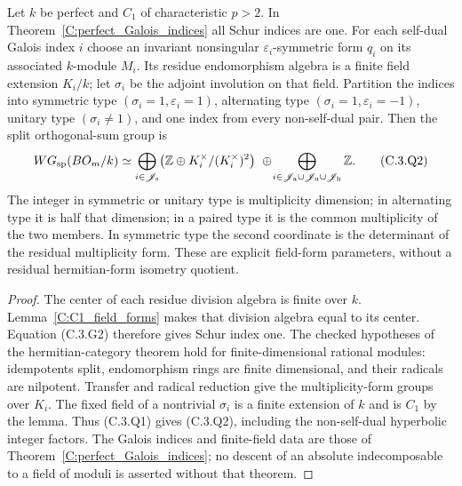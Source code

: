 \begin{proposition}
\label{C:C1_Galois_WG}
Let $k$ be perfect and $C_1$ of characteristic $p>2$.
In Theorem~\ref{C:perfect_Galois_indices} all Schur indices are one.
For each self-dual Galois index $i$ choose an invariant nonsingular
$\varepsilon_i$-symmetric form $q_i$ on its associated $k$-module $M_i$.
Its residue endomorphism algebra is a finite field extension $K_i/k$;
let $\sigma_i$ be the adjoint involution on that field. Partition
the indices into symmetric type $(\sigma_i=1,\varepsilon_i=1)$,
alternating type $(\sigma_i=1,\varepsilon_i=-1)$, unitary type
$(\sigma_i\ne1)$, and one index from every non-self-dual pair.
Then the split orthogonal-sum group is
\[
 WG_{\rm sp}(BO_m/k)\simeq
 \bigoplus_{i\in\mathscr J_{\rm s}}
    \bigl(\mathbb Z\oplus K_i^\times/(K_i^\times)^2\bigr)
 \ \oplus\!
 \bigoplus_{i\in\mathscr J_{\rm a}\cup\mathscr J_{\rm u}
                      \cup\mathscr J_{\rm h}}\mathbb Z .    \tag{C.3.Q2}
\]
The integer in symmetric or unitary type is multiplicity dimension;
in alternating type it is half that dimension; in a paired type it
is the common multiplicity of the two members. In symmetric type
the second coordinate is the determinant of the residual multiplicity
form. These are explicit field-form parameters, without a residual
hermitian-form isometry quotient.
\end{proposition}
\begin{proof}
The center of each residue division algebra is finite over $k$.
Lemma~\ref{C:C1_field_forms} makes that division algebra equal to its
center. Equation (C.3.G2) therefore gives Schur index one.
The checked hypotheses of the hermitian-category theorem
\cite[Propositions 2.4--2.5 and Theorems 3.2--3.3,
pp.271--273]{C-QSS1979} hold for finite-dimensional rational modules:
idempotents split, endomorphism rings are finite dimensional, and their
radicals are nilpotent. Transfer and radical reduction give the
multiplicity-form groups over $K_i$. The fixed field of a nontrivial
$\sigma_i$ is a finite extension of $k$ and is $C_1$ by the lemma.
Thus (C.3.Q1) gives (C.3.Q2), including the non-self-dual hyperbolic
integer factors. The Galois indices and finite-field data are those
of Theorem~\ref{C:perfect_Galois_indices}; no descent of an absolute
indecomposable to a field of moduli is asserted without that theorem.
\end{proof}

